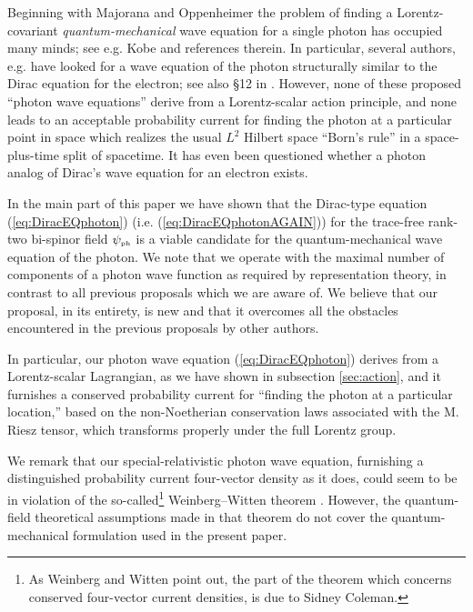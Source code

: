 \documentclass[11pt]{article}
\theoremstyle{definition}
\newcommand{\refeq}[1]{(\ref{#1})}
\numberwithin{equation}{section}
\newcommand{\psiPH}{{\psi_{\mbox{\rm\tiny ph}}}}
\begin{document}
  Beginning with Majorana \cite{MajoranaUnpublished} and Oppenheimer \cite{OppiPHOTON} the problem of finding a
Lorentz-covariant \emph{quantum-mechanical} wave equation for a single photon has occupied many minds; see e.g. Kobe \cite{Kob1999} 
and references therein.
 In particular, several authors, e.g. \cite{OppiPHOTON, Good1957, SachsSchwebel, MosesQM, BiBiTHREE, TamburiniVicino, Mohr} have looked 
for a wave equation of the photon structurally similar to the Dirac equation for the electron; see also
{\S}12 in \cite{IBBphotonREV}.
 However, none of these proposed ``photon wave equations'' derive from a Lorentz-scalar action principle, and none
leads to an acceptable probability current for finding the photon at a particular point in space  which realizes the
usual $L^2$ Hilbert space ``Born's rule'' in a space-plus-time split of spacetime.
 It has even been questioned whether a photon analog of Dirac's wave equation for an electron exists. 

 In the main part of this paper we have shown that the Dirac-type equation \refeq{eq:DiracEQphoton} (i.e. \refeq{eq:DiracEQphotonAGAIN}) for 
the trace-free rank-two bi-spinor field $\psiPH$ is a viable candidate for the quantum-mechanical wave equation of the photon.
 We note that we operate with the maximal number of components of a photon wave function as required by representation theory,
in contrast to all previous proposals which we are aware of.
 We believe that our proposal, in its entirety, is new and that it overcomes all the obstacles encountered in the previous proposals
by other authors. 

 In particular, our photon wave equation \refeq{eq:DiracEQphoton} derives from a Lorentz-scalar Lagrangian, as we have shown 
in subsection \ref{sec:action}, and it furnishes a conserved probability current for ``finding the photon at a particular location,'' 
based on the non-Noetherian conservation laws associated with the M. Riesz tensor, which transforms properly under the full Lorentz group.

 We remark that our special-relativistic photon wave equation, furnishing a distinguished probability current four-vector density as it
does, could seem to be in violation of the so-called\footnote{As Weinberg and Witten point
  out, the part of the theorem which concerns conserved four-vector current densities, is due to Sidney Coleman.}
 Weinberg--Witten theorem \cite{WeinbergWitten}.
 However, the quantum-field theoretical assumptions made in that theorem do not cover the quantum-mechanical formulation used in 
the present paper. 
\end{document}
